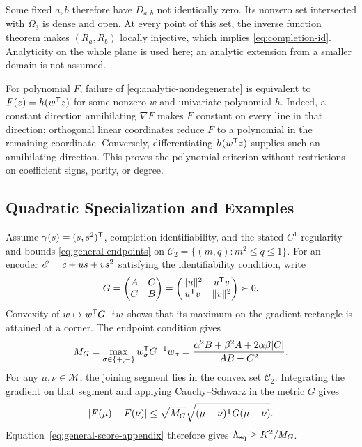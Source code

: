 Some fixed $a,b$ therefore have $D_{a,b}$ not identically zero. Its nonzero set intersected with $\Omega_3$ is dense and open. At every point of this set, the inverse function theorem makes $(R_a,R_b)$ locally injective, which implies \eqref{eq:completion-id}. Analyticity on the whole plane is used here; an analytic extension from a smaller domain is not assumed.

For polynomial $F$, failure of \eqref{eq:analytic-nondegenerate} is equivalent to $F(z)=h(w^\mathsf T z)$ for some nonzero $w$ and univariate polynomial $h$. Indeed, a constant direction annihilating $\nabla F$ makes $F$ constant on every line in that direction; orthogonal linear coordinates reduce $F$ to a polynomial in the remaining coordinate. Conversely, differentiating $h(w^\mathsf T z)$ supplies such an annihilating direction. This proves the polynomial criterion without restrictions on coefficient signs, parity, or degree.

\subsection{Quadratic Specialization and Examples}

Assume $\gamma(s)=(s,s^2)^\mathsf T$, completion identifiability, and the stated $C^1$ regularity and bounds \eqref{eq:general-endpoints} on $\mathcal C_2=\{(m,q):m^2\le q\le1\}$. For an encoder $\mathscr E=c+us+vs^2$ satisfying the identifiability condition, write
$$
 G=\begin{pmatrix}A&C\\C&B\end{pmatrix}
 =\begin{pmatrix}\|u\|^2&u^\mathsf T v\\u^\mathsf T v&\|v\|^2\end{pmatrix}\succ0.
$$
Convexity of $w\mapsto w^\mathsf T G^{-1}w$ shows that its maximum on the gradient rectangle is attained at a corner. The endpoint condition gives
$$
 M_G=\max_{\sigma\in\{+,-\}}w_\sigma^\mathsf T G^{-1}w_\sigma
 =\frac{\alpha^2B+\beta^2A+2\alpha\beta|C|}{AB-C^2}.
$$
For any $\mu,\nu\in\mathcal M$, the joining segment lies in the convex set $\mathcal C_2$. Integrating the gradient on that segment and applying Cauchy--Schwarz in the metric $G$ gives
$$
 |F(\mu)-F(\nu)|\le\sqrt{M_G}\sqrt{(\mu-\nu)^\mathsf T G(\mu-\nu)}.
$$
Equation~\eqref{eq:general-score-appendix} therefore gives $\Lambda_{\mathrm{sq}}\ge K^2/M_G$.

